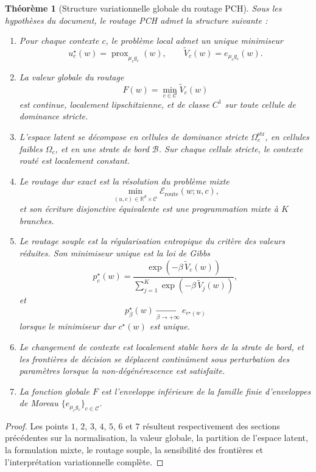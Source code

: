 \documentclass[11pt,a4paper]{article}
\newtheorem{theorem}{Théorème}[section]
\DeclareMathOperator{\prox}{prox}
\newcommand{\R}{\mathbb R}
\newcommand{\Ccal}{\mathcal C}
\begin{document}
\begin{theorem}[Structure variationnelle globale du routage PCH]
Sous les hypothèses du document, le routage PCH admet la structure suivante :
\begin{enumerate}[leftmargin=2em]
\item Pour chaque contexte \(c\), le problème local admet un unique minimiseur
\[
u_c^\star(w)=\prox_{\mu_c g_c}(w),
\qquad
\widetilde V_c(w)=e_{\mu_c g_c}(w).
\]

\item La valeur globale du routage
\[
F(w)=\min_{c\in\Ccal}\widetilde V_c(w)
\]
est continue, localement lipschitzienne, et de classe \(C^1\) sur toute cellule de dominance stricte.

\item L'espace latent se décompose en cellules de dominance stricte \(\Omega_c^{\mathrm{str}}\), en cellules faibles \(\Omega_c\), et en une strate de bord \(\mathcal B\). Sur chaque cellule stricte, le contexte routé est localement constant.

\item Le routage dur exact est la résolution du problème mixte
\[
\min_{(u,c)\in\R^d\times\Ccal}\mathcal E_{\mathrm{route}}(w;u,c),
\]
et son écriture disjonctive équivalente est une programmation mixte à \(K\) branches.

\item Le routage souple est la régularisation entropique du critère des valeurs réduites. Son minimiseur unique est la loi de Gibbs
\[
p_c^\star(w)
=
\frac{\exp(-\beta\,\widetilde V_c(w))}
{\sum_{j=1}^K \exp(-\beta\,\widetilde V_j(w))},
\]
et
\[
p^\star_\beta(w)\xrightarrow[\beta\to+\infty]{}e_{c^\star(w)}
\]
lorsque le minimiseur dur \(c^\star(w)\) est unique.

\item Le changement de contexte est localement stable hors de la strate de bord, et les frontières de décision se déplacent continûment sous perturbation des paramètres lorsque la non-dégénérescence est satisfaite.

\item La fonction globale \(F\) est l'enveloppe inférieure de la famille finie d'enveloppes de Moreau \(\{e_{\mu_c g_c}\}_{c\in\Ccal}\).
\end{enumerate}
\end{theorem}

\begin{proof}
Les points \(1\), \(2\), \(3\), \(4\), \(5\), \(6\) et \(7\) résultent respectivement des sections précédentes sur la normalisation, la valeur globale, la partition de l'espace latent, la formulation mixte, le routage souple, la sensibilité des frontières et l'interprétation variationnelle complète.
\end{proof}
\end{document}
